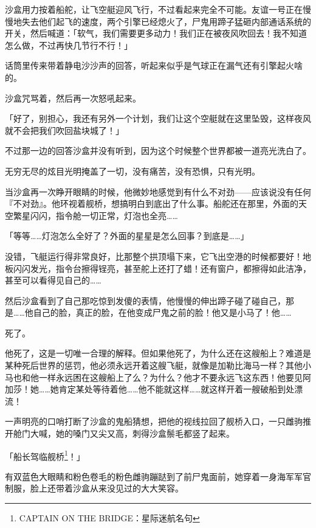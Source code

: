 \horizonline


沙盒用力按着船舵，让飞空艇迎风飞行，不过看起来完全不可能。友谊一号正在慢慢地失去他们起飞的速度，两个引擎已经熄火了，尸鬼用蹄子猛砸内部通话系统的开关，然后喊道：「软气，我们需要更多动力！我们正在被夜风吹回去！我不知道怎么做，不过再快几节行不行！」

话筒里传来带着静电沙沙声的回答，听起来似乎是气球正在漏气还有引擎起火啥的。

沙盒咒骂着，然后再一次怒吼起来。

「好了，别担心，我还有另外一个计划，我们让这个空艇就在这里坠毁，这样夜风就不会把我们吹回盐块城了！」

不过那一边的回答沙盒并没有听到，因为这个时候整个世界都被一道亮光洗白了。

无穷无尽的炫目光明掩盖了一切，没有痛苦，没有恐惧，只有光明。

\horizonline

\unknowndaytimeplace

当沙盒再一次睁开眼睛的时候，他微妙地感觉到有什么不对劲——应该说没有任何『不对劲』。他环视着舰桥，想搞明白到底出了什么事。船舵还在那里，外面的天空繁星闪闪，指令舱一切正常，灯泡也全亮……{}

「等等……灯泡怎么全好了？外面的星星是怎么回事？到底是……」

没错，飞艇运行得非常良好，比那整个拱顶塌下来，它飞出空港的时候都要好！地板闪闪发光，指令台擦得锃亮，甚至舵上还打了蜡！还有窗户，都擦得如此洁净，甚至可以看得见自己的……{}

然后沙盒看到了自己那吃惊到发傻的表情，他慢慢的伸出蹄子碰了碰自己，那是……他自己的脸，真正的脸，在他变成尸鬼之前的脸！他又是小马了！他……{}

死了。

他死了，这是一切唯一合理的解释。但如果他死了，为什么还在这艘船上？难道是某种死后世界的惩罚，他必须永远开着这艘飞艇，就像是加勒比海马一样？其他小马也和他一样永远困在这艘船上了么？为什么？他才不要永远飞这东西！他要见阿加莎！她……她肯定某处等待着他……他不能就这样……就这样开着一艘破船到处漂流！

一声明亮的口哨打断了沙盒的鬼船猜想，把他的视线拉回了舰桥入口，一只雌驹推开舱门大喊，她的嗓门又尖又高，刺得沙盒鬃毛都竖了起来。

「船长驾临舰桥\footnote{CAPTAIN ON THE BRIDGE：星际迷航名句}！」

有双蓝色大眼睛和粉色卷毛的粉色雌驹蹦跶到了前尸鬼面前，她穿着一身海军军官制服，脸上还带着沙盒从来没见过的大大笑容。

